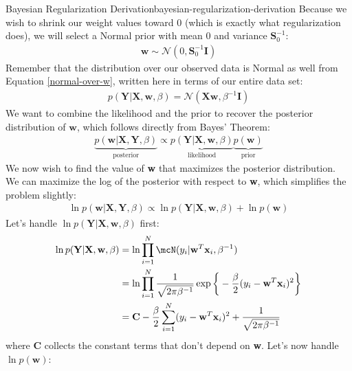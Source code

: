 \begin{derivation}{Bayesian Regularization Derivation}{bayesian-regularization-derivation}
    Because we wish to shrink our weight values toward 0 (which is exactly what regularization does), we will select a Normal prior with mean 0 and variance $\boldsymbol{S}_{0}^{-1}$:
    \begin{align*}
        \textbf{w} \sim \mathcal{N}(0, \boldsymbol{S}_{0}^{-1}\textbf{I})
    \end{align*}
    Remember that the distribution over our observed data is Normal as well from Equation \ref{normal-over-w}, written here in terms of our entire data set:
    \begin{align*}
        p(\textbf{Y} | \textbf{X}, \textbf{w}, \beta) = \mathcal{N}(\textbf{X}\textbf{w}, \beta^{-1}\textbf{I})
    \end{align*}
    We want to combine the likelihood and the prior to recover the posterior distribution of $\textbf{w}$, which follows directly from Bayes' Theorem:
    \begin{align*}
        \underbrace{p(\textbf{w}|\textbf{X},\textbf{Y}, \beta)}_{\text{posterior}} \propto \underbrace{p(\textbf{Y}| \textbf{X}, \textbf{w}, \beta)}_{\text{likelihood}}\underbrace{p(\textbf{w})}_{\text{prior}}
    \end{align*}
    We now wish to find the value of \textbf{w} that maximizes the posterior distribution. We can maximize the log of the posterior with respect to \textbf{w}, which simplifies the problem slightly:
    \begin{align*}
        \ln{p(\textbf{w}|\textbf{X},\textbf{Y}, \beta)} \propto \ln{p(\textbf{Y}| \textbf{X}, \textbf{w}, \beta)} + \ln{p(\textbf{w})}
    \end{align*}
    Let's handle $\ln{p(\textbf{Y}| \textbf{X}, \textbf{w}, \beta)}$ first:
    \begin{align*}
        \ln{p(\textbf{Y}| \textbf{X}, \textbf{w}, \beta)} &= \ln{\prod_{i=1}^{N} \mcN(y_{i} | \textbf{w}^{T} \textbf{x}_{i}, \beta^{-1})} \\
        &= \ln{\prod_{i=1}^{N} \frac{1}{\sqrt{2\pi\beta^{-1}}} \exp{\bigg\{-\frac{\beta}{2}(y_{i} - \textbf{w}^{T} \textbf{x}_{i})^2\bigg\}}} \\
        &= \textbf{C} -\frac{\beta}{2}\sum_{i=1}^{N} (y_{i} - \textbf{w}^{T} \textbf{x}_{i})^2 + \frac{1}{\sqrt{2\pi\beta^{-1}}}
    \end{align*}
    where \textbf{C} collects the constant terms that don't depend on \textbf{w}. Let's now handle $\ln{p(\textbf{w})}$:

\end{derivation}
